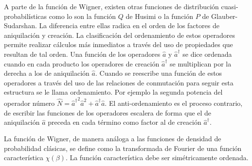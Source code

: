 A parte de la función de Wigner, existen otras funciones de distribución cuasi-probabilísticas como lo son la función $Q$ de Husimi o la función $P$ de Glauber-Sudarshan. La diferencia entre ellas radica en el orden de los factores de aniquilación y creación. La clasificación del ordenamiento de estos operadores permite realizar cálculos más inmediatos a través del uso de propiedades que resultan de tal orden. Una función de los operadores $\hat{a}$ y $\hat{a}^\dagger$ se dice ordenada cuando en cada producto los operadores de creación $\hat{a}^\dagger$ se multiplican por la derecha a los de aniquilación $\hat{a}$. Cuando se reescribe una función de estos operadores a través del uso de las relaciones de conmutación para seguir esta estructura se le llama ordenamiento. Por ejemplo la segunda potencia del operador número $\hat{N}={\hat{a}^\dagger}^2 \hat{a}^2 + \hat{a}^\dagger \hat{a}$. El anti-ordenamiento es el proceso contrario, de escribir las funciones de los operadores escalera de forma que el de aniquilación $\hat{a}$ preceda en cada término como factor al de creación $\hat{a}^\dagger$.

La función de Wigner, de manera análoga a las funciones de densidad de probabilidad clásicas, se define como la transformada de Fourier de una función característica $\chi(\beta)$. La función característica debe ser simétricamente ordenada.

